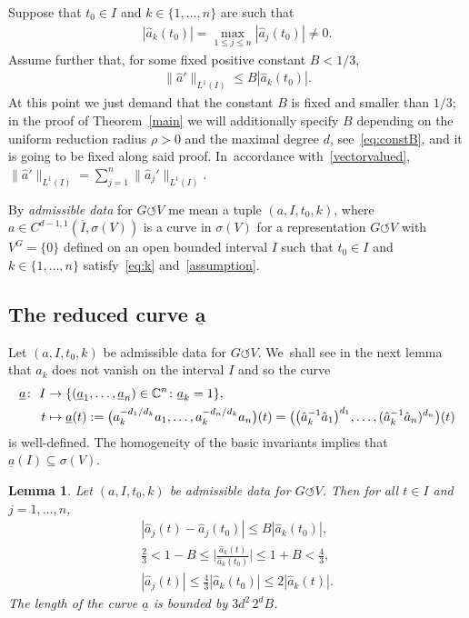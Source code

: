 \documentclass[pdftex]{sigma}
\numberwithin{equation}{section}
\newtheorem{Lemma}[Theorem]{Lemma}
\def\rh{\rho}
\def\si{\sigma}
\def\C{\mathbb{C}}
\def\ol{\overline}
\def\ul{\underline}
\def\we{\hat}
\def\acts{\circlearrowleft}
\begin{document}
Suppose that $t_0 \in I$ and $k \in \{1,\dots,n\}$ are such that
\begin{gather} \label{eq:k}
 |\we a_k(t_0)| = \max_{1 \le j \le n} |\we a_j(t_0)| \ne 0.
 \end{gather}
Assume further that, for some fixed positive constant $B < 1/3$,
\begin{gather}\label{assumption}
 \|\we a'\|_{L^1 (I)} \le B |\we a_k(t_0)|.
\end{gather}
At this point we just demand that the constant $B$ is fixed and smaller than $1/3$; in the proof of Theorem~\ref{main}
we will additionally specify $B$ depending on the uniform reduction radius $\rh>0$ and the maximal degree $d$, see~\eqref{eq:constB},
and it is going to be fixed along said proof. In~accordance with~\eqref{vectorvalued}, $\|\we a'\|_{L^1 (I)} = \sum_{j=1}^n \|\we a_j'\|_{L^1 (I)}$.

\begin{Definition}
 By \emph{admissible data} for $G \acts V$ me mean a tuple $(a, I, t_0, k)$, where
 $a \in C^{d-1,1}(\ol I,\si(V))$ is a curve in $\si(V)$ for a representation $G \acts V$ with $V^G = \{0\}$
 defined on an open bounded interval $I$ such that
 $t_0 \in I$ and $k \in \{1,\dots,n\}$ satisfy~\eqref{eq:k} and~\eqref{assumption}.
\end{Definition}




\subsection[The reduced curve a]{The reduced curve $\boldsymbol{\ul a}$}

Let $(a, I, t_0, k)$ be admissible data for $G \acts V$. We~shall see in the next lemma that
$a_k$ does not vanish on the interval $I$ and so the curve
\begin{align}
 \underline a \colon\ I &\to \{(\underline a_1,\dots,\underline a_n) \in \C^{n} \colon \underline a_k=1\}, \notag
 \\
 t &\mapsto \ul a(t) := \big( a_k^{-d_1/d_k} a_1, \dots, a_k^{-d_n/d_k} a_n\big)(t)
 = \big( \big(\we a_k^{-1} \we a_1\big)^{d_1}, \dots, (\we a_k^{-1} \we a_n)^{d_n}\big)(t)
 \label{curve}
\end{align}
is well-defined. The homogeneity of the basic invariants implies that $\ul a(I) \subseteq \si(V)$.

\begin{Lemma} \label{lem1}
 Let $(a, I, t_0, k)$ be admissible data for $G \acts V$.
 Then for all $t \in I$ and $j=1,\dots,n$,
 \begin{gather} \label{eq:ass10}
 |\we a_j (t) - \we a_j (t_0)| \le B |\we a_k (t_0)|,
 \\[1ex]
 \frac 2 3 < 1-B \le \bigg | \frac{\we a_k(t)}{\we a_k(t_0)} \bigg | \le 1+B < \frac4 3,\label{eq:ass11}
 \\[1ex]
 |\we a_j(t)| \le \frac 4 3 |\we a_k(t_0)| \le 2 |\we a_k(t)|.\label{eq:ass12}
 \end{gather}
 The length of the curve $\ul a$
 is bounded by $3 d^2\, 2^{d} B$.
\end{Lemma}
\end{document}
